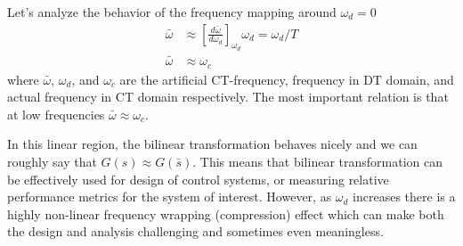 \documentclass[twoside]{article}
\begin{document}
Let's analyze the behavior of the frequency mapping around 
$\omega_d = 0$
%
\begin{align*}
\bar{\omega} &\approx \left[ \frac{d \bar{\omega}}{d \omega_d} 
\right]_{\omega_d} \omega_d = \omega_d / T 
\\ 
\bar{\omega} &\approx \omega_c
\end{align*}
%
where $\bar{\omega}$, $\omega_d$, and $\omega_c$ are 
the artificial CT-frequency, frequency in DT domain, and
actual frequency in CT domain respectively. The most important
relation is that at low frequencies $\bar{\omega} \approx \omega_c$.


In this linear region, the bilinear transformation behaves nicely
and we can roughly say that $G(s) \approx G(\bar{s})$. This means 
that bilinear transformation can be effectively used for design
of control systems, or measuring relative performance metrics
for the system of interest. However, as $\omega_d$ increases
there is a highly non-linear frequency wrapping (compression)
effect which can make both the design and analysis challenging
and sometimes even meaningless. 
\end{document}
